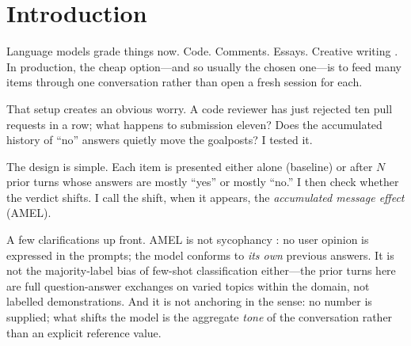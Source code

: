 \documentclass[10pt,twocolumn]{article}
\begin{document}
\section{Introduction}
\label{sec:intro}

Language models grade things now. Code. Comments. Essays. Creative writing \cite{zheng2024judging}. In production, the cheap option---and so usually the chosen one---is to feed many items through one conversation rather than open a fresh session for each.

That setup creates an obvious worry. A code reviewer has just rejected ten pull requests in a row; what happens to submission eleven? Does the accumulated history of ``no'' answers quietly move the goalposts? I tested it.

The design is simple. Each item is presented either alone (baseline) or after $N$ prior turns whose answers are mostly ``yes'' or mostly ``no.'' I then check whether the verdict shifts. I call the shift, when it appears, the \textit{accumulated message effect} (AMEL).

A few clarifications up front. AMEL is not sycophancy \cite{sharma2024understanding}: no user opinion is expressed in the prompts; the model conforms to \textit{its own} previous answers. It is not the majority-label bias of few-shot classification \cite{zhao2021calibrate} either---the prior turns here are full question-answer exchanges on varied topics within the domain, not labelled demonstrations. And it is not anchoring in the \citet{jones2024anchoring} sense: no number is supplied; what shifts the model is the aggregate \textit{tone} of the conversation rather than an explicit reference value.
\end{document}
